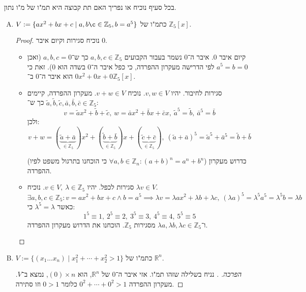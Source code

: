 \documentclass[]{article}
\newcommand\Z     {\mathbb{Z}}
\newcommand\R     {\mathbb{R}}
\newcommand\co        {\colon}
\renewcommand\lg      {\lambda}
\newcommand\tl    {\tilde}
\begin{document}
	\section{}
	בכל סעיף נוכיח או נפריך האם תת קבוצה היא תמ"ו של מ"ו נתון. 
	\begin{enumerate}[A)]
		\item $V := \{ax^2 + bx  + c \mid a, b \c \in \Z_5, b = a^5\}$ כתמ"ו של $\Z_5[x]$. \begin{proof}
			נוכיח סגירות וקיום איבר $0$. 
			\begin{itemize}
				\item קיום איבר $0$. איבר ה־$0$ נשמר בעבור הקבועים $a, b, c \in \Z_5$ כך ש־$a, b, c = 0$ (ואכן $a^5 = b = 0$ לפי הדרישה מעקרון ההפרדה, כי כפל איבר ה־$0$ בשדה הוא $0$). זאת כי $0x^2 + 0x + 0$ הוא איבר ה־$0$ ב־$\Z_5[x]$. 
				\item סגירות לחיבור. יהיו $v, w \in V$. נוכיח $v + w \in V$. מעקרון ההפרדה, קיימים $\tl a, \tl b, \tl c, \bar a, \bar b, \bar c \in \Z_5$ כך ש־: 
				\[ v = \tl ax^2 + \tl b + \tl c, \ w = \bar a x^2 + \bar b x + \bar c x, \ \tl a^5 = \tl b, \ \bar a^5 = \bar b \]
				ולכן: 
				\[ v + w = (\underbrace{\tl a + \bar a}_{\in \Z_5})x^2 + (\underbrace{\tl b + \bar b}_{\in \Z_5})x + (\underbrace{\tl c + \bar c}_{\in \Z_5}), \ (\tl a + \bar a)^5 = \tl a^5 + \bar a^5 = \tl b + \bar b \]

				(כי הוכחנו בתרגול משפט לפיו $\forall a, b \in \Z_n\co (a + b)^n = a^n + b^n$) כדרוש מעקרון ההפרדה. 
				\item סגירות לכפל. יהיו $v \in V, \ \lg \in \Z_5$. נוכיח $\lg v \in V$. 
				\[ \exists a, b, c \in \Z_5 \co v = ax^2 + bx + c \land b = a^5 \implies \lg v = \lg ax^2 + \lg b + \lg c, \ (\lg a)^5 = \lg^5a^5 = \lg^5 b = \lg b \]
				כאשר $\lg ^5 = \lg$ כי: 
				\[ 1^5 \equiv 1, \ 2^5 \equiv 2, \ 3^5 \equiv 3, \ 4^5 \equiv 4, \ 5^5 \equiv 5 \]
				ו־$\lg a, \lg b, \lg c \in \Z_5$ מסגירות $\Z_5$. הוכחנו את הדרוש מעקרון ההפרדה. 
			\end{itemize}
		\end{proof}
			
		\item $V := \{(x_1 \dots x_n) \mid x_1^2 + \cdots + x_2^2 > 1\}$ כתמ"ו של $\R^n$. \begin{proof}[הפרכה. ]				נניח בשלילה שזהו תמ"ו. אזי איבר ה־$0$ של $\R^n$, הוא $(0) \times n$, נמצא ב־$V$. מעקרון ההפרדה $0^2 + \cdots + 0^2 > 1$ כלומר $0 > 1$ וזו סתירה. 
		\end{proof}
		

\end{enumerate}
\end{document}
